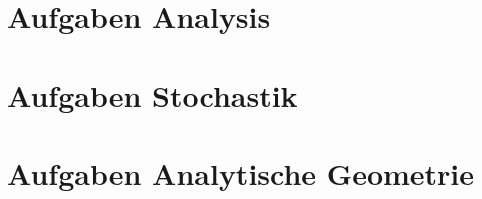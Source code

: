 \documentclass[12pt,twoside,openright,parskip=half,colorlinks=true]{scrbook}
\begin{document}
\maketitle
\tableofcontents

\part{Aufgaben Analysis}
\renewcommand{\currentCategory}{A}
\renewcommand{\thechapter}{A\arabic{chapter}}
\renewcommand{\theHchapter}{A\arabic{chapter}}
\setcounter{chapter}{0}






\part{Aufgaben Stochastik}
\renewcommand{\currentCategory}{S}
\renewcommand{\thechapter}{S\arabic{chapter}}
\renewcommand{\theHchapter}{S\arabic{chapter}}
\setcounter{chapter}{0}


\part{Aufgaben Analytische Geometrie}
\renewcommand{\currentCategory}{G}
\renewcommand{\thechapter}{G\arabic{chapter}}
\renewcommand{\theHchapter}{G\arabic{chapter}}
\setcounter{chapter}{0}
\end{document}
